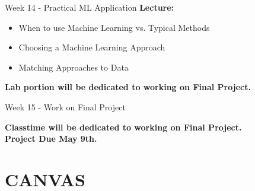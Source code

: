 \documentclass[aspectratio=169,xcolor=dvipsnames]{beamer}
\begin{document}
\begin{frame}{Week 14 - Practical ML Application}
    \textbf{Lecture:}
    \begin{itemize}
        \setlength{\itemsep}{.25cm}
        \item When to use Machine Learning vs. Typical Methods
        \item Choosing a Machine Learning Approach
        \item Matching Approaches to Data
    \end{itemize}
\vspace{2cm}
\textbf{Lab portion will be dedicated to working on Final Project.}
\end{frame}

\begin{frame}{Week 15 - Work on Final Project}
\begin{center}
    \textbf{Classtime will be dedicated to working on Final Project.}\\
    \textbf{Project Due May 9th.}
\end{center}
\end{frame}

\section{CANVAS}



\end{document}
